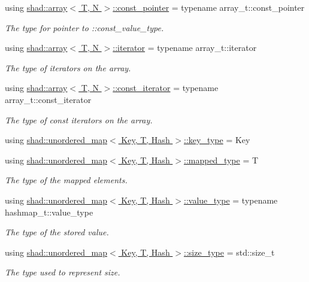 \begin{DoxyCompactItemize}
using \hyperlink{group__Types_gaf7a2ac6cd741ccfb7bbb1378fbc85218}{shad\-::array$<$ T, N $>$\-::const\-\_\-pointer} = typename array\-\_\-t\-::const\-\_\-pointer
\begin{DoxyCompactList}\small\item\em The type for pointer to \-::const\-\_\-value\-\_\-type. \end{DoxyCompactList}\item 
using \hyperlink{group__Types_ga7b1db0deafc45673f50da5aacb8c372c}{shad\-::array$<$ T, N $>$\-::iterator} = typename array\-\_\-t\-::iterator
\begin{DoxyCompactList}\small\item\em The type of iterators on the array. \end{DoxyCompactList}\item 
using \hyperlink{group__Types_ga2c50f8cbc96829f139f8138f1bac40bf}{shad\-::array$<$ T, N $>$\-::const\-\_\-iterator} = typename array\-\_\-t\-::const\-\_\-iterator
\begin{DoxyCompactList}\small\item\em The type of const iterators on the array. \end{DoxyCompactList}\item 
using \hyperlink{group__Types_gac2a5bb16d47a5da2d493616e6fa5a73c}{shad\-::unordered\-\_\-map$<$ Key, T, Hash $>$\-::key\-\_\-type} = Key
\item 
using \hyperlink{group__Types_ga146f53b5d4191c21deed1bd89683d4bf}{shad\-::unordered\-\_\-map$<$ Key, T, Hash $>$\-::mapped\-\_\-type} = T
\begin{DoxyCompactList}\small\item\em The type of the mapped elements. \end{DoxyCompactList}\item 
using \hyperlink{group__Types_ga930e4848d41a2efe4d2e47f52650a76c}{shad\-::unordered\-\_\-map$<$ Key, T, Hash $>$\-::value\-\_\-type} = typename hashmap\-\_\-t\-::value\-\_\-type
\begin{DoxyCompactList}\small\item\em The type of the stored value. \end{DoxyCompactList}\item 
using \hyperlink{group__Types_ga2a84980e6d435a8a7b1a99f78b828a65}{shad\-::unordered\-\_\-map$<$ Key, T, Hash $>$\-::size\-\_\-type} = std\-::size\-\_\-t
\begin{DoxyCompactList}\small\item\em The type used to represent size. \end{DoxyCompactList}\item 

\end{DoxyCompactItemize}
